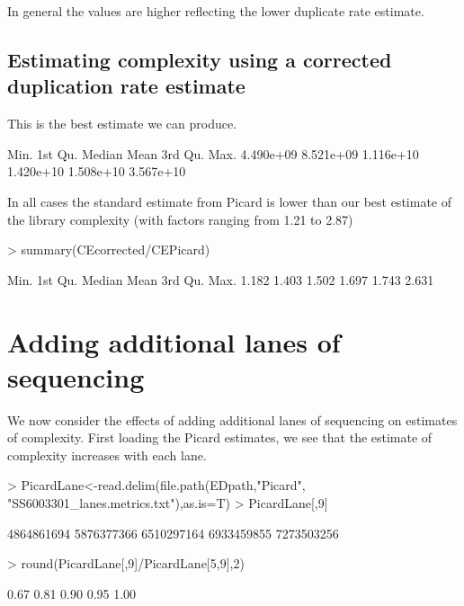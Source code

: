 \documentclass{article}
\begin{document}
In general the values are higher reflecting the lower duplicate rate estimate.

\subsection{Estimating complexity using a corrected duplication rate estimate}

This is the best estimate we can produce.

\begin{Schunk}
\begin{Soutput}
     Min.   1st Qu.    Median      Mean   3rd Qu.      Max. 
4.490e+09 8.521e+09 1.116e+10 1.420e+10 1.508e+10 3.567e+10 
\end{Soutput}
\end{Schunk}



In all cases the standard estimate from Picard is lower than our best estimate of the library complexity (with factors ranging from 1.21 to 2.87) 
  
\begin{Schunk}
\begin{Sinput}
> summary(CEcorrected/CEPicard)
\end{Sinput}
\begin{Soutput}
   Min. 1st Qu.  Median    Mean 3rd Qu.    Max. 
  1.182   1.403   1.502   1.697   1.743   2.631 
\end{Soutput}
\end{Schunk}
  
\clearpage{}


\section{Adding additional lanes of sequencing}

We now consider the effects of adding additional lanes of sequencing on estimates of complexity. First loading the Picard estimates, we see that the estimate of complexity increases with each lane.

\begin{Schunk}
\begin{Sinput}
> PicardLane<-read.delim(file.path(EDpath,"Picard", "SS6003301_lanes.metrics.txt"),as.is=T)
> PicardLane[,9]
\end{Sinput}
\begin{Soutput}
[1] 4864861694 5876377366 6510297164 6933459855 7273503256
\end{Soutput}
\begin{Sinput}
> round(PicardLane[,9]/PicardLane[5,9],2)
\end{Sinput}
\begin{Soutput}
[1] 0.67 0.81 0.90 0.95 1.00
\end{Soutput}
\end{Schunk}
\end{document}
